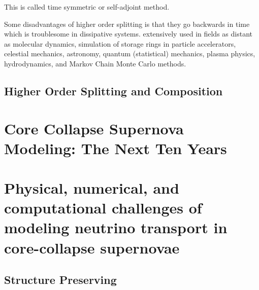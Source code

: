 This is called time symmetric or self-adjoint method.

Some disadvantages of higher order splitting is that they go backwards in time which is troublesome in dissipative systems. extensively used in fields as distant as molecular dynamics, simulation of storage rings in particle accelerators, celestial mechanics, astronomy, quantum (statistical) mechanics, plasma physics, hydrodynamics, and Markov Chain Monte Carlo methods.

\subsection{Higher Order Splitting and Composition}




\section{Core Collapse Supernova Modeling: The Next Ten Years}


\section{Physical, numerical, and computational challenges of modeling neutrino transport in core-collapse supernovae}

\subsection{Structure Preserving}
